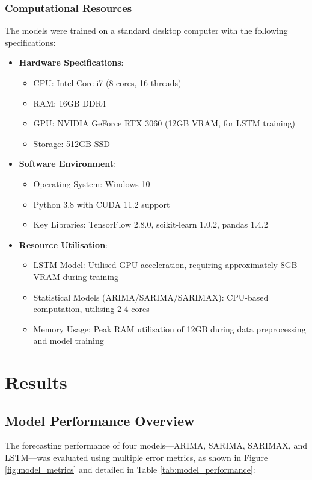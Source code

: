 \documentclass[12pt,a4paper]{report}
\begin{document}
\subsection{Computational Resources}
The models were trained on a standard desktop computer with the following specifications:
\begin{itemize}
    \item \textbf{Hardware Specifications}:
    \begin{itemize}
        \item CPU: Intel Core i7 (8 cores, 16 threads)
        \item RAM: 16GB DDR4
        \item GPU: NVIDIA GeForce RTX 3060 (12GB VRAM, for LSTM training)
        \item Storage: 512GB SSD
    \end{itemize}
    
    \item \textbf{Software Environment}:
    \begin{itemize}
        \item Operating System: Windows 10
        \item Python 3.8 with CUDA 11.2 support
        \item Key Libraries: TensorFlow 2.8.0, scikit-learn 1.0.2, pandas 1.4.2
    \end{itemize}
    
    \item \textbf{Resource Utilisation}:
    \begin{itemize}
        \item LSTM Model: Utilised GPU acceleration, requiring approximately 8GB VRAM during training
        \item Statistical Models (ARIMA/SARIMA/SARIMAX): CPU-based computation, utilising 2-4 cores
        \item Memory Usage: Peak RAM utilisation of 12GB during data preprocessing and model training
    \end{itemize}
\end{itemize}

\chapter{Results}
\section{Model Performance Overview}
\sloppy
The forecasting performance of four models---ARIMA, SARIMA, SARIMAX, and LSTM---was evaluated using multiple error metrics, as shown in Figure \ref{fig:model_metrics} and detailed in Table \ref{tab:model_performance}:
\end{document}
